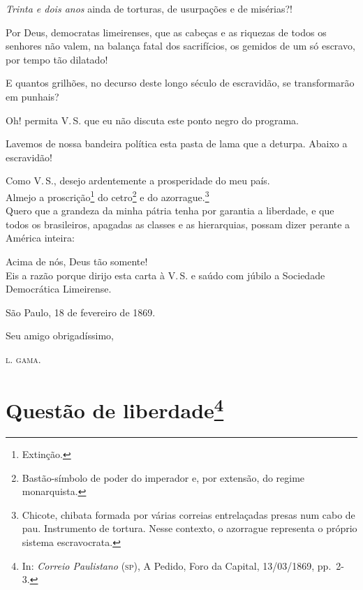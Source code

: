 \emph{Trinta e dois anos} ainda de torturas, de usurpações e de
misérias?!

Por Deus, democratas limeirenses, que as cabeças e as riquezas de todos
os senhores não valem, na balança fatal dos sacrifícios, os gemidos de
um só escravo, por tempo tão dilatado!

E quantos grilhões, no decurso deste longo século de escravidão, se
transformarão em punhais?

Oh! permita V.\,S. que eu não discuta este ponto negro do programa.

Lavemos de nossa bandeira política esta pasta de lama que a deturpa.
Abaixo a escravidão!

\noindent\dotfill

Como V.\,S., desejo ardentemente a prosperidade do meu país.\\
Almejo a proscrição\footnote{Extinção.} do cetro\footnote{
  Bastão-símbolo de poder do imperador e, por extensão, do regime
  monarquista.} e do azorrague.\footnote{Chicote, chibata formada por
  várias correias entrelaçadas presas num cabo de pau. Instrumento de
  tortura. Nesse contexto, o azorrague representa o próprio sistema
  escravocrata.}\\
Quero que a grandeza da minha pátria tenha por garantia a liberdade, e
que todos os brasileiros, apagadas as classes e as hierarquias, possam
dizer perante a América inteira:

Acima de nós, Deus tão somente!\\
Eis a razão porque dirijo esta carta à V.\,S. e saúdo com júbilo a
Sociedade Democrática Limeirense.
\begin{flushright}
São Paulo, 18 de fevereiro de 1869.

Seu amigo obrigadíssimo,

\textsc{l. gama}.
\end{flushright}
\chapter{Questão de liberdade\footnote{In: \emph{Correio Paulistano} (\textsc{sp}),
  A Pedido, Foro da Capital, 13/03/1869, pp.~2-3.}}

